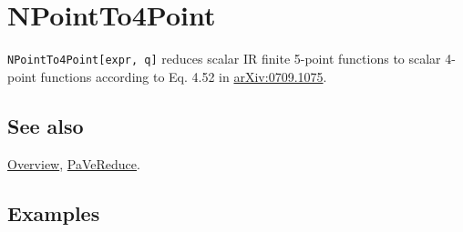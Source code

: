 \documentclass[../FeynCalcManual.tex]{subfiles}
\begin{document}
\hypertarget{npointto4point}{%
\section{NPointTo4Point}\label{npointto4point}}

\texttt{NPointTo4Point[\allowbreak{}expr,\ \allowbreak{}q]} reduces
scalar IR finite 5-point functions to scalar 4-point functions according
to Eq. 4.52 in \href{https://arxiv.org/abs/0709.1075}{arXiv:0709.1075}.

\subsection{See also}

\hyperlink{toc}{Overview}, \hyperlink{pavereduce}{PaVeReduce}.

\subsection{Examples}

\begin{Shaded}
\begin{Highlighting}[]
\OperatorTok{[]} 
 
\OperatorTok{[}\OperatorTok{]} \ExtensionTok{=} \NormalTok{; }
 
\OperatorTok{[}\OperatorTok{,}\OperatorTok{]} \ExtensionTok{=} \NormalTok{; }
 
\OperatorTok{[}\OperatorTok{,}\OperatorTok{]} \ExtensionTok{=} \NormalTok{; }
 
\OperatorTok{[}\OperatorTok{,}\OperatorTok{]} \ExtensionTok{=} \NormalTok{; }
 
\OperatorTok{[}\OperatorTok{,}\OperatorTok{]} \ExtensionTok{=} \NormalTok{; }
 
\ExtensionTok{=}\OperatorTok{[}\OperatorTok{[\{}\OperatorTok{,}\OperatorTok{\},} \OperatorTok{\{} \SpecialCharTok{+}\OperatorTok{,} \OperatorTok{\},} \OperatorTok{\{} \SpecialCharTok{+}\OperatorTok{,} \OperatorTok{\},} \OperatorTok{\{} \SpecialCharTok{+}\OperatorTok{,} \OperatorTok{\},} \OperatorTok{\{} \SpecialCharTok{+}\OperatorTok{,} \OperatorTok{\}]]}
\end{Highlighting}
\end{Shaded}
\end{document}
